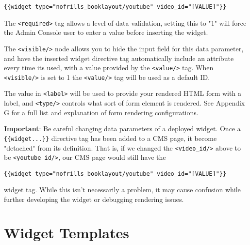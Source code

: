 \documentclass[oneside]{book}
\begin{document}
\begin{lstlisting}
{{widget type="nofrills_booklayout/youtube" video_id="[VALUE]"}}

\end{lstlisting}


The \footnotesize\texttt{\textless required\textgreater } \normalsize  tag allows a level of data validation, setting this to "1" will force the Admin Console user to enter a value before inserting the widget.

The \footnotesize\texttt{\textless visible/\textgreater } \normalsize  node allows you to hide the input field for this data parameter, and have the inserted widget directive tag automatically include an attribute every time its used, with a value provided by the \footnotesize\texttt{\textless value/\textgreater } \normalsize  tag.  When \footnotesize\texttt{\textless visible/\textgreater } \normalsize  is set to 1 the \footnotesize\texttt{\textless value/\textgreater } \normalsize  tag will be used as a default ID.

The value in \footnotesize\texttt{\textless label\textgreater } \normalsize  will be used to provide your rendered HTML form with a label, and \footnotesize\texttt{\textless type/\textgreater } \normalsize  controls what sort of form element is rendered.  See Appendix G for a full list and explanation of form rendering configurations.

\textbf{Important}: Be careful changing data parameters of a deployed widget.  Once a \footnotesize\texttt{\{\{widget...\}\}} \normalsize  directive tag has been added to a CMS page, it become "detached" from its definition.  That is, if we changed the \footnotesize\texttt{\textless video\_id/\textgreater } \normalsize  above to be \footnotesize\texttt{\textless youtube\_id/\textgreater }\normalsize, our CMS page would still have the

\begin{lstlisting}
{{widget type="nofrills_booklayout/youtube" video_id="[VALUE]"}}

\end{lstlisting}


widget tag.  While this isn't necessarily a problem, it may cause confusion while further developing the widget or debugging rendering issues.

\section{Widget Templates}
\end{document}
